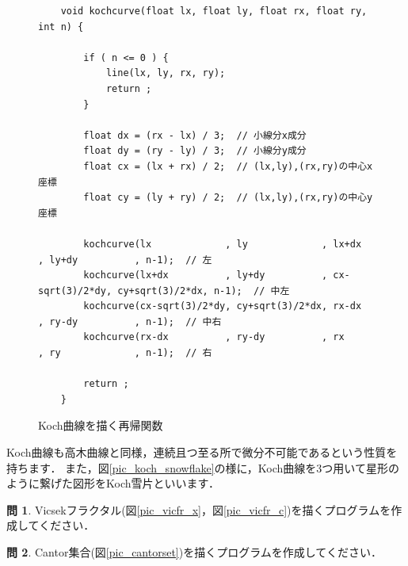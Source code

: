 \documentclass[dvipdfmx]{jsarticle}
\theoremstyle{definition}
\newtheorem{question}{問}[section]
\begin{document}
\begin{figure}[ht]
\begin{center}
\begin{oframed}
\footnotesize
\begin{verbatim}
    void kochcurve(float lx, float ly, float rx, float ry, int n) {

        if ( n <= 0 ) {
            line(lx, ly, rx, ry);
            return ;
        }

        float dx = (rx - lx) / 3;  // 小線分x成分
        float dy = (ry - ly) / 3;  // 小線分y成分
        float cx = (lx + rx) / 2;  // (lx,ly),(rx,ry)の中心x座標
        float cy = (ly + ry) / 2;  // (lx,ly),(rx,ry)の中心y座標

        kochcurve(lx             , ly             , lx+dx          , ly+dy          , n-1);  // 左
        kochcurve(lx+dx          , ly+dy          , cx-sqrt(3)/2*dy, cy+sqrt(3)/2*dx, n-1);  // 中左
        kochcurve(cx-sqrt(3)/2*dy, cy+sqrt(3)/2*dx, rx-dx          , ry-dy          , n-1);  // 中右
        kochcurve(rx-dx          , ry-dy          , rx             , ry             , n-1);  // 右

        return ;
    }
\end{verbatim}
\end{oframed}
\end{center}
\caption{Koch曲線を描く再帰関数}
\label{code_koch_curve}
\end{figure}

Koch曲線も高木曲線と同様，連続且つ至る所で微分不可能であるという性質を持ちます．
また，図\ref{pic_koch_snowflake}の様に，Koch曲線を3つ用いて星形のように繋げた図形をKoch雪片といいます．


\vspace{\baselineskip}

\begin{question}
    Vicsekフラクタル(図\ref{pic_vicfr_x}，図\ref{pic_vicfr_c})を描くプログラムを作成してください．
\end{question}

\begin{question}
    Cantor集合(図\ref{pic_cantorset})を描くプログラムを作成してください．
\end{question}
\end{document}
